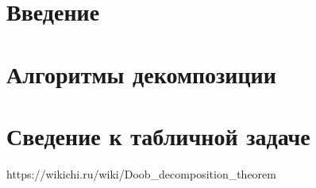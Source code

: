 \documentclass[a4paper,12pt]{book}
\begin{document}
	\newpage
	\tableofcontents
	
	\newpage
	\chapter{Введение}
	
	
	
	\newpage
	\chapter{Алгоритмы декомпозиции}
	
	

	\newpage
	\chapter{Сведение к табличной задаче}
	

	\newpage

\begin{thebibliography}{1}
	https://wikichi.ru/wiki/Doob\_decomposition\_theorem
\end{thebibliography}


	
\end{document}
